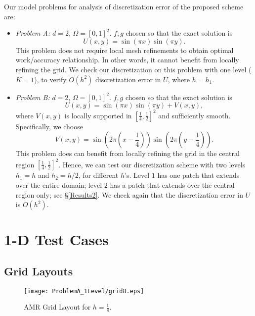 \documentclass[12pt]{article}
\def \be {\begin{equation}}
\def \ee {\end{equation}}
\def \bi {\begin{itemize}}
\def \ei {\end{itemize}}
\begin{document}
Our model problems for analysis of discretization error of the proposed scheme
are:
\bi
\item \emph{Problem A:} $d = 2$, $\Omega = [0,1]^2$.
$f,g$ chosen so that the exact solution is
\be
U(x,y) = \sin\left(\pi x\right) \sin\left(\pi y\right).
\ee
This problem does not require local mesh refinements to obtain optimal
work/accuracy relationship. In other words, it cannot benefit from locally
refining the grid. We check our discretization on this problem with one level
($K=1$), to verify $O(h^2)$ discretization error in $U$, where $h=h_1$.

\item \emph{Problem B:} $d = 2$, $\Omega = [0,1]^2$.
$f,g$ chosen so that the exact solution is
\be
U(x,y) = \sin(\pi x) \sin(\pi y) + V(x,y),
\ee
where $V(x,y)$ is locally supported in $[\frac14,\frac12]^2$ and sufficiently
smooth. Specifically, we choose
\be
V(x,y) = \sin\left(2 \pi (x-\frac14)\right)
\sin\left(2 \pi (y - \frac14)\right).
\ee
This problem does can benefit from locally refining the grid in the central
region $[\frac14,\frac12]^2$. Hence, we can test our discretization scheme
with two levels $h_1=h$ and $h_2=h/2$, for different $h$'s. Level $1$ has
one patch that extends over the entire domain; level $2$ has a patch that
extends over the central region only; see \S \ref{Results2}. We check again
that the discretization error in $U$ is $O(h^2)$.
\ei

\newpage
\section{1-D Test Cases}
\label{Results1D}

\subsection{Grid Layouts}
\begin{figure}[htbp]
\begin{center}
\texttt{[image: ProblemA\_1Level/grid8.eps]}
\end{center}
\caption{AMR Grid Layout for $h = \frac18$.} \label{grid8}
\end{figure}

\newpage



\end{document}
